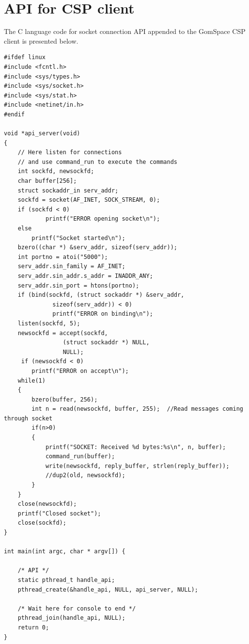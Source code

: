 \documentclass[english,12pt,a4paper,pdftex,elec,utf8]{aaltothesis}
\begin{document}
\section{API for CSP client\label{LiiteD}}
The C language code for socket connection API appended to the GomSpace CSP client is presented below.
\begin{verbatim}
#ifdef linux
#include <fcntl.h>
#include <sys/types.h>
#include <sys/socket.h>
#include <sys/stat.h>
#include <netinet/in.h>
#endif

void *api_server(void)
{
	// Here listen for connections
	// and use command_run to execute the commands
	int sockfd, newsockfd;
    char buffer[256];
	struct sockaddr_in serv_addr;
	sockfd = socket(AF_INET, SOCK_STREAM, 0);
	if (sockfd < 0) 
        	printf("ERROR opening socket\n");
	else
		printf("Socket started\n");
	bzero((char *) &serv_addr, sizeof(serv_addr));
    int portno = atoi("5000");
    serv_addr.sin_family = AF_INET;
    serv_addr.sin_addr.s_addr = INADDR_ANY;
	serv_addr.sin_port = htons(portno);
	if (bind(sockfd, (struct sockaddr *) &serv_addr,
              sizeof(serv_addr)) < 0) 
              printf("ERROR on binding\n");
	listen(sockfd, 5);
	newsockfd = accept(sockfd, 
                 (struct sockaddr *) NULL, 
                 NULL);
     if (newsockfd < 0) 
        printf("ERROR on accept\n");
	while(1)
	{
		bzero(buffer, 256);
		int n = read(newsockfd, buffer, 255);  //Read messages coming through socket
		if(n>0)
		{
			printf("SOCKET: Received %d bytes:%s\n", n, buffer);
			command_run(buffer); 
			write(newsockfd, reply_buffer, strlen(reply_buffer));
			//dup2(old, newsockfd);
		}
	}
	close(newsockfd);
	printf("Closed socket");
	close(sockfd);	
}

int main(int argc, char * argv[]) {

    /* API */
	static pthread_t handle_api;
	pthread_create(&handle_api, NULL, api_server, NULL);
	
	/* Wait here for console to end */
	pthread_join(handle_api, NULL);
	return 0;
}
\end{verbatim}
\clearpage
\end{document}
